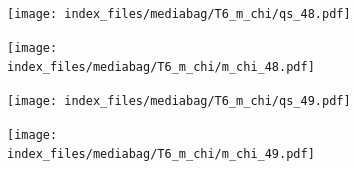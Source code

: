 \documentclass[
  11pt,
  letterpaper,
]{scrreprt}
\begin{document}
\begin{figure}

\begin{minipage}{0.50\linewidth}

\begin{figure}[H]

{\centering \texttt{[image: index\_files/mediabag/T6\_m\_chi/qs\_48.pdf]}

}


\end{figure}%

\end{minipage}%
%
\begin{minipage}{0.50\linewidth}

\begin{figure}[H]

{\centering \texttt{[image: index\_files/mediabag/T6\_m\_chi/m\_chi\_48.pdf]}

}


\end{figure}%

\end{minipage}%

\end{figure}%

\begin{figure}

\begin{minipage}{0.50\linewidth}

\begin{figure}[H]

{\centering \texttt{[image: index\_files/mediabag/T6\_m\_chi/qs\_49.pdf]}

}


\end{figure}%

\end{minipage}%
%
\begin{minipage}{0.50\linewidth}

\begin{figure}[H]

{\centering \texttt{[image: index\_files/mediabag/T6\_m\_chi/m\_chi\_49.pdf]}

}


\end{figure}%

\end{minipage}%

\end{figure}%
\end{document}
